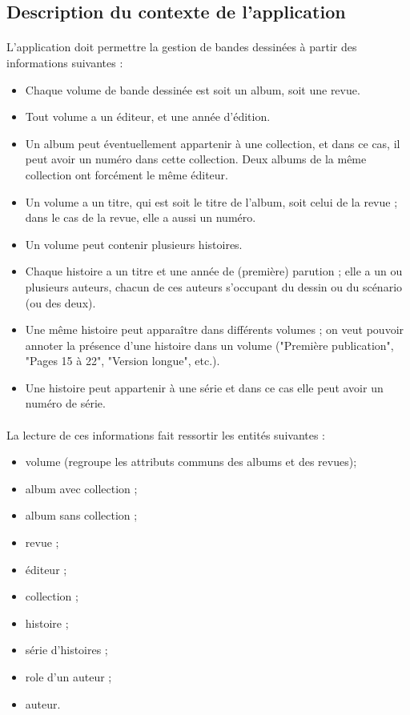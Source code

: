 \documentclass[12pt]{article}
\begin{document}
\subsection{Description du contexte de l'application}

\paragraph{}
L'application doit permettre la gestion de bandes dessinées à partir des
informations suivantes :

\begin{itemize}
	\item Chaque volume de bande dessinée est soit un album, soit une revue.
	\item Tout volume a un éditeur, et une année d’édition.
	\item Un album peut éventuellement appartenir à une collection, et dans ce cas, il
		peut avoir un numéro dans cette collection. Deux albums de la même collection
		ont forcément le même éditeur.
	\item Un volume a un titre, qui est soit le titre de l'album, soit celui de la
		revue ; dans le cas de la revue, elle a aussi un numéro.
	\item Un volume peut contenir plusieurs histoires.
	\item Chaque histoire a un titre et une année de (première) parution ; elle a un
		ou plusieurs auteurs, chacun de ces auteurs s’occupant du dessin ou du
		scénario (ou des deux).
	\item Une même histoire peut apparaître dans différents volumes ; on veut pouvoir
		annoter la présence d’une histoire dans un volume ("Première publication",
		"Pages 15 à 22", "Version longue", etc.).
	\item Une histoire peut appartenir à une série et dans ce cas elle peut avoir un
		numéro de série.
\end{itemize}

\paragraph{}
La lecture de ces informations fait ressortir les entités suivantes :
\begin{itemize}
	\item volume (regroupe les attributs communs des albums et des revues);
	\item album avec collection ;
	\item album sans collection ;
	\item revue ;
	\item éditeur ;
	\item collection ;
	\item histoire ;
	\item série d'histoires ;
	\item role d'un auteur ;
	\item auteur.
\end{itemize}
\end{document}
